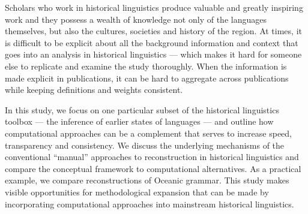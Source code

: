 \documentclass[12pt,letterpaper]{article}
\begin{document}
Scholars who work in historical linguistics produce valuable and greatly inspiring work and they possess a wealth of knowledge not only of the languages themselves, but also the cultures, societies and history of the region. At times, it is difficult to be explicit about all the background information and context that goes into an analysis in historical linguistics --- which makes it hard for someone else to replicate and examine the study thoroughly. When the information is made explicit in publications, it can be hard to aggregate across publications while keeping definitions and weights consistent.

In this study, we focus on one particular subset of the historical linguistics toolbox --- the inference of earlier states of languages --- and outline how computational approaches can be a complement that serves to increase speed, transparency and consistency. We discuss the underlying mechanisms of the conventional ``manual'' approaches to reconstruction in historical linguistics and compare the conceptual framework to computational alternatives. As a practical example, we compare reconstructions of Oceanic grammar. This study makes visible opportunities for methodological expansion that can be made by incorporating computational approaches into mainstream historical linguistics.
\end{document}
